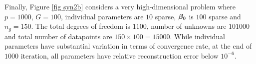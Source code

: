 	
Finally, Figure \ref{fig syn2b} considers a very high-dimensional problem where $p=1000$, $G=100$, individual parameters are $10$ sparse, $\boldsymbol{\beta}_0$ is $100$ sparse and $n_g=150$. The total degrees of freedom is $1100$, number of unknowns are $101000$ and total number of datapoints are $150\times 100=15000$. While individual parameters have substantial variation in terms of convergence rate, at the end of $1000$ iteration, all parameters have relative reconstruction error below $10^{-6}$.
%			
%			
%	
%			
%			

\vspace{5mm}

